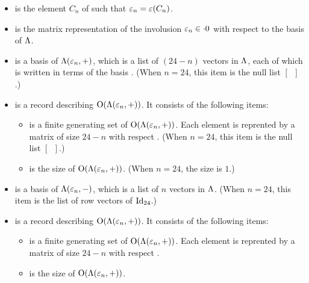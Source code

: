 \documentclass{amsart} %
\begin{document}
\begin{itemize}
\begin{itemize}
\item {} is the  element $C_n$ of  such that $\varepsilon_n=\varepsilon(C_n)$.
%
\item {} is the matrix representation of the involusion $\varepsilon_n\in \cdot 0$
with respect to the basis   of $\Lambda$.
%
\item {} is a basis of $\Lambda(\varepsilon_n, +)$,
which is a list of $(24-n)$ vectors in $\Lambda$,
each of which is written in terms of  the basis  .
(When $n=24$, this item is the null list $[\phantom{a}]$.)
%
\item {}  is a record describing $\mathord{\mathrm{O}}(\Lambda(\varepsilon_n, +))$.
It consists of the following items:
\begin{itemize}
\item {}   is a finite generating set
of $\mathord{\mathrm{O}}(\Lambda(\varepsilon_n, +))$.
Each element is reprented by a matrix of size $24-n$
with respect   .
(When $n=24$, this item is the null list $[\phantom{a}]$.)
\item {}  is the size of  $\mathord{\mathrm{O}}(\Lambda(\varepsilon_n, +))$.
(When $n=24$, the size is $1$.)
\end{itemize}
%
\item {} is a basis of $\Lambda(\varepsilon_n, -)$,
which is a list of $n$ vectors in $\Lambda$. 
(When $n=24$, this item is the list of row vectors of $\mathord{\mathrm{Id}}_{24}$.)
%
\item {}  is a record describing $\mathord{\mathrm{O}}(\Lambda(\varepsilon_n, +))$.
It consists of the following items:
\begin{itemize}
\item {}   is a finite generating set
of $\mathord{\mathrm{O}}(\Lambda(\varepsilon_n, +))$.
Each element is reprented by a matrix of size $24-n$
with respect   .
\item {}  is the size of  $\mathord{\mathrm{O}}(\Lambda(\varepsilon_n, +))$.
\end{itemize}
%
 \end{itemize}
%
%
 \end{itemize}
%
%
\end{document}
